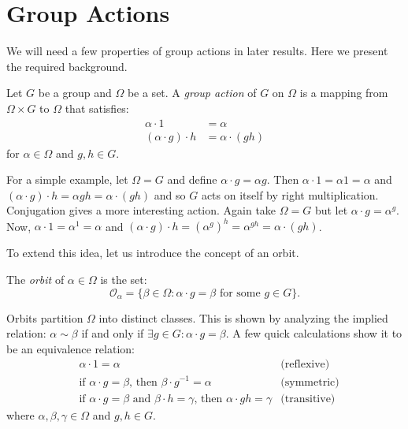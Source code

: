 \documentclass[main.tex]{subfiles}
\begin{document}
\chapter{Group Actions}

We will need a few properties of group actions in later results. Here we present the required background.

\hss

\begin{definition}
Let $G$ be a group and $\Omega$ be a set. A \emph{group action} of $G$ on $\Omega$ is a mapping from $\Omega \times G$ to $\Omega$ that satisfies:
\begin{align*}
\alpha \cdot 1 &= \alpha \\
(\alpha \cdot g) \cdot h &= \alpha \cdot (gh)
\end{align*}
for $\alpha \in \Omega$ and $g, h \in G$.
\end{definition}

\hss

For a simple example, let $\Omega = G$ and define $\alpha \cdot g = \alpha g$. Then $\alpha \cdot 1 = \alpha 1 = \alpha$ and $(\alpha \cdot g) \cdot h = \alpha g h = \alpha \cdot (gh)$ and so $G$ acts on itself by right multiplication. Conjugation gives a more interesting action. Again take $\Omega = G$ but let $\alpha \cdot g = \alpha^g$. Now, $\alpha \cdot 1 = \alpha^1 = \alpha$ and $(\alpha \cdot g) \cdot h = (\alpha^g)^h = \alpha^{gh} = \alpha \cdot (gh)$.

To extend this idea, let us introduce the concept of an orbit.

\hss

\begin{definition}
The \emph{orbit} of $\alpha \in \Omega$ is the set:
$$\mathcal{O}_\alpha = \{ \beta \in \Omega : \alpha \cdot g = \beta \text{ for some } g \in G \}\text{.}$$
\end{definition}

\hss

Orbits partition $\Omega$ into distinct classes. This is shown by analyzing the implied relation: $\alpha \sim \beta$ if and only if $\exists g \in G : \alpha \cdot g = \beta$. A few quick calculations show it to be an equivalence relation:
\begin{align*}
&\alpha \cdot 1 = \alpha &\text{(reflexive)} \\
&\text{if } \alpha \cdot g = \beta \text{, then } \beta \cdot g^{-1} = \alpha &\text{(symmetric)} \\
&\text{if } \alpha \cdot g = \beta \text{ and } \beta \cdot h = \gamma \text{, then } \alpha \cdot gh = \gamma  &\text{(transitive)}
\end{align*}
where $\alpha, \beta, \gamma \in \Omega$ and $g, h \in G$.
\end{document}
